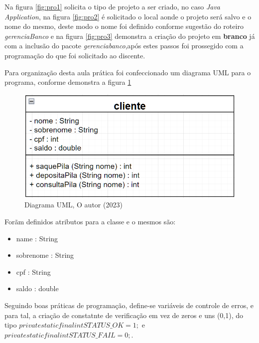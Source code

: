 \newpage

\par Na figura \ref{fig:pro1} solicita o tipo de projeto a ser criado, no caso \textit{Java Application}, na figura \ref{fig:pro2} é solicitado o local aonde o projeto será salvo e o nome do mesmo, deste modo o nome foi definido conforme sugestão do roteiro \textit{gerenciaBanco} e na figura \ref{fig:pro3} demonstra a criação do projeto em \textbf{branco} já com a inclusão do pacote \textit{gerenciabanco},após  estes passos foi prossegido com a programação do que foi solicitado ao discente.

\par Para organização desta aula prática foi confeccionado um diagrama UML para o programa, conforme demonstra a figura \ref{fig:uml}

\begin{figure}[h!]
  \includegraphics[width=\textwidth]{figure/uml_classe.png}
  \caption{Diagrama UML, O autor (2023)}
  \label{fig:uml}
\end{figure}

\newpage

\par Forãm definidos atributos para a classe e o mesmos são:
\begin{itemize}
  \item name : String
  \item sobrenome : String
  \item cpf : String
  \item saldo : double
\end{itemize}

\par Seguindo boas práticas de programação, define-se variáveis de controle de erros, e para tal, a criação de constatnte de verificação em vez de zeros e uns (0,1), do tipo $private static final int  STATUS\_OK = 1;$ e $private static final int STATUS\_FAIL = 0;$.


